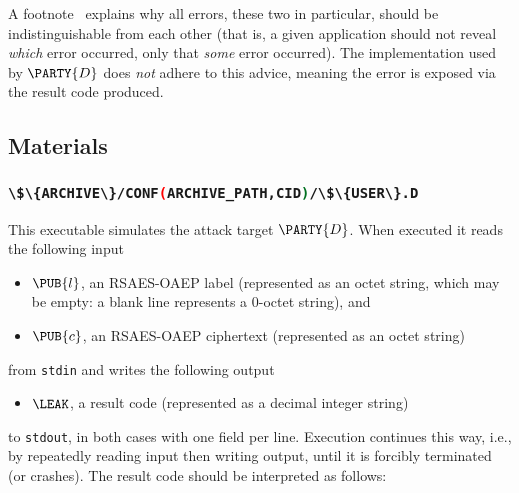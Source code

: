 \documentclass[crop={false},multi={true},tikz={true}]{standalone}
\begin{document}
\noindent
A footnote~\cite[Section 7.1.2]{SCALE:RFC:3447} explains why all errors, 
these two in particular, should be indistinguishable from each other (that
is, a given application should not reveal {\em which} error occurred, only 
that {\em some} error occurred).  The implementation used by $\PARTY{D}$ 
does {\em not} adhere to this advice, meaning the error is exposed via 
the result code produced.

\subsection{Materials}

\subsubsection{\lstinline[language={bash}]|\$\{ARCHIVE\}/CONF(ARCHIVE_PATH,CID)/\$\{USER\}.D|}

This executable simulates the attack target $\PARTY{D}$.  When executed it 
reads the following input

\begin{itemize}
\item $\PUB{l}$,
      an RSAES-OAEP label
      (represented as an               octet string, which may be empty: a blank line represents a $0$-octet string),
      and
\item $\PUB{c}$,
      an RSAES-OAEP ciphertext
      (represented as an               octet string)
\end{itemize}

\noindent
from \lstinline[language={bash}]{stdin} and writes the following output

\begin{itemize}
\item $\LEAK$,
      a  result code
      (represented as a      decimal integer string)
\end{itemize}

\noindent
to \lstinline[language={bash}]{stdout}, in both cases with one field per 
line.  Execution continues this way, i.e., by repeatedly reading input 
then writing output, until it is forcibly terminated (or crashes).  
The result code should be interpreted as follows:
\end{document}
